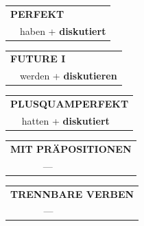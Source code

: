 \documentclass[10pt,a4paper]{revtex4-2}
\begin{document}
\begin{verbbox-acc}
 \begin{tabular}{rl}
     \multicolumn{2}{l}{\textbf{PERFEKT}}\\
  &  haben + \textbf{diskutiert}\\
  \end{tabular}
\hfill
   \begin{tabular}{rl}
   
    \multicolumn{2}{l}{\textbf{FUTURE I} }\\
  &  werden + \textbf{diskutieren}\\
 
  \end{tabular}
\hfill
   \begin{tabular}{rl}
      \multicolumn{2}{l}{\textbf{PLUSQUAMPERFEKT}}\\
  &  hatten + \textbf{diskutiert}\\
  \end{tabular}
  
  \vspace{10pt}

\begin{tabular}{lll}
\multicolumn{3}{l}{\textbf{MIT PRÄPOSITIONEN}}\\
& ---\\
\end{tabular}
\hfill
\begin{tabular}{lll}
\multicolumn{3}{l}{\textbf{TRENNBARE VERBEN}}\\
& ---\\
\end{tabular}

  \vspace{-5pt}


\end{verbbox-acc}
\end{document}
